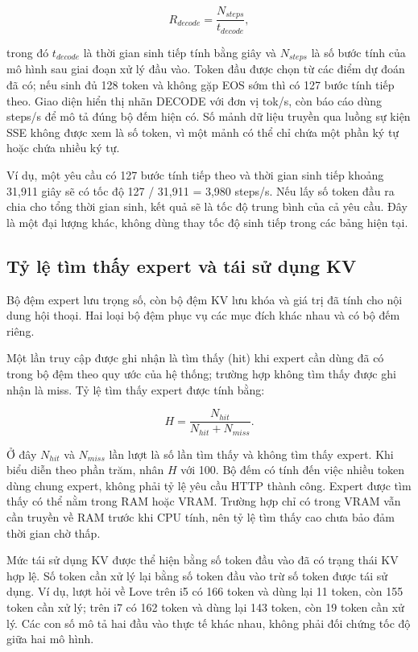 \begin{equation}
\label{eq:2.11}
R_{decode}=\frac{N_{steps}}{t_{decode}},
\end{equation}

trong đó $t_{decode}$ là thời gian sinh tiếp tính bằng giây và $N_{steps}$ là số bước tính của mô hình sau giai đoạn xử lý đầu vào. Token đầu được chọn từ các điểm dự đoán đã có; nếu sinh đủ 128 token và không gặp EOS sớm thì có 127 bước tính tiếp theo. Giao diện hiển thị nhãn DECODE với đơn vị tok/s, còn báo cáo dùng steps/s để mô tả đúng bộ đếm hiện có. Số mảnh dữ liệu truyền qua luồng sự kiện SSE không được xem là số token, vì một mảnh có thể chỉ chứa một phần ký tự hoặc chứa nhiều ký tự.

Ví dụ, một yêu cầu có 127 bước tính tiếp theo và thời gian sinh tiếp khoảng 31,911 giây sẽ có tốc độ 127 / 31,911 = 3,980 steps/s. Nếu lấy số token đầu ra chia cho tổng thời gian sinh, kết quả sẽ là tốc độ trung bình của cả yêu cầu. Đây là một đại lượng khác, không dùng thay tốc độ sinh tiếp trong các bảng hiện tại.

\subsection{Tỷ lệ tìm thấy expert và tái sử dụng KV}

Bộ đệm expert lưu trọng số, còn bộ đệm KV lưu khóa và giá trị đã tính cho nội dung hội thoại. Hai loại bộ đệm phục vụ các mục đích khác nhau và có bộ đếm riêng.

Một lần truy cập được ghi nhận là tìm thấy (hit) khi expert cần dùng đã có trong bộ đệm theo quy ước của hệ thống; trường hợp không tìm thấy được ghi nhận là miss. Tỷ lệ tìm thấy expert được tính bằng:

\begin{equation}
\label{eq:2.12}
H=\frac{N_{hit}}{N_{hit}+N_{miss}}.
\end{equation}

Ở đây $N_{hit}$ và $N_{miss}$ lần lượt là số lần tìm thấy và không tìm thấy expert. Khi biểu diễn theo phần trăm, nhân $H$ với 100. Bộ đếm có tính đến việc nhiều token dùng chung expert, không phải tỷ lệ yêu cầu HTTP thành công. Expert được tìm thấy có thể nằm trong RAM hoặc VRAM. Trường hợp chỉ có trong VRAM vẫn cần truyền về RAM trước khi CPU tính, nên tỷ lệ tìm thấy cao chưa bảo đảm thời gian chờ thấp.

Mức tái sử dụng KV được thể hiện bằng số token đầu vào đã có trạng thái KV hợp lệ. Số token cần xử lý lại bằng số token đầu vào trừ số token được tái sử dụng. Ví dụ, lượt hỏi về Love trên i5 có 166 token và dùng lại 11 token, còn 155 token cần xử lý; trên i7 có 162 token và dùng lại 143 token, còn 19 token cần xử lý. Các con số mô tả hai đầu vào thực tế khác nhau, không phải đối chứng tốc độ giữa hai mô hình.


